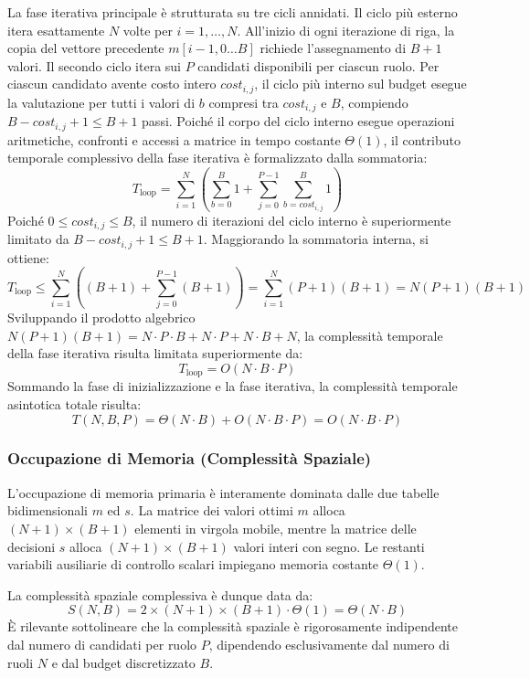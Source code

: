 La fase iterativa principale è strutturata su tre cicli annidati. Il ciclo più esterno itera esattamente $N$ volte per $i = 1, \dots, N$. All'inizio di ogni iterazione di riga, la copia del vettore precedente $m[i-1, 0 \dots B]$ richiede l'assegnamento di $B + 1$ valori. Il secondo ciclo itera sui $P$ candidati disponibili per ciascun ruolo. Per ciascun candidato avente costo intero $\mathit{cost}_{i,j}$, il ciclo più interno sul budget esegue la valutazione per tutti i valori di $b$ compresi tra $\mathit{cost}_{i,j}$ e $B$, compiendo $B - \mathit{cost}_{i,j} + 1 \le B + 1$ passi. Poiché il corpo del ciclo interno esegue operazioni aritmetiche, confronti e accessi a matrice in tempo costante $\Theta(1)$, il contributo temporale complessivo della fase iterativa è formalizzato dalla sommatoria:
\begin{equation}
	T_{\text{loop}} = \sum_{i=1}^N \left( \sum_{b=0}^B 1 + \sum_{j=0}^{P - 1} \sum_{b=\mathit{cost}_{i,j}}^B 1 \right)
\end{equation}
Poiché $0 \le \mathit{cost}_{i,j} \le B$, il numero di iterazioni del ciclo interno è superiormente limitato da $B - \mathit{cost}_{i,j} + 1 \le B + 1$. Maggiorando la sommatoria interna, si ottiene:
\begin{equation}
	T_{\text{loop}} \le \sum_{i=1}^N \left( (B + 1) + \sum_{j=0}^{P - 1} (B + 1) \right) = \sum_{i=1}^N (P + 1)(B + 1) = N(P + 1)(B + 1)
\end{equation}
Sviluppando il prodotto algebrico $N(P + 1)(B + 1) = N \cdot P \cdot B + N \cdot P + N \cdot B + N$, la complessità temporale della fase iterativa risulta limitata superiormente da:
\begin{equation}
	T_{\text{loop}} = O(N \cdot B \cdot P)
\end{equation}
Sommando la fase di inizializzazione e la fase iterativa, la complessità temporale asintotica totale risulta:
\begin{equation}
	T(N, B, P) = \Theta(N \cdot B) + O(N \cdot B \cdot P) = O(N \cdot B \cdot P)
\end{equation}

\subsubsection{Occupazione di Memoria (Complessità Spaziale)}
L'occupazione di memoria primaria è interamente dominata dalle due tabelle bidimensionali $m$ ed $s$. La matrice dei valori ottimi $m$ alloca $(N + 1) \times (B + 1)$ elementi in virgola mobile, mentre la matrice delle decisioni $s$ alloca $(N + 1) \times (B + 1)$ valori interi con segno. Le restanti variabili ausiliarie di controllo scalari impiegano memoria costante $\Theta(1)$.

La complessità spaziale complessiva è dunque data da:
\begin{equation}
	S(N, B) = 2 \times (N + 1) \times (B + 1) \cdot \Theta(1) = \Theta(N \cdot B)
\end{equation}
È rilevante sottolineare che la complessità spaziale è rigorosamente indipendente dal numero di candidati per ruolo $P$, dipendendo esclusivamente dal numero di ruoli $N$ e dal budget discretizzato $B$.

\newpage
